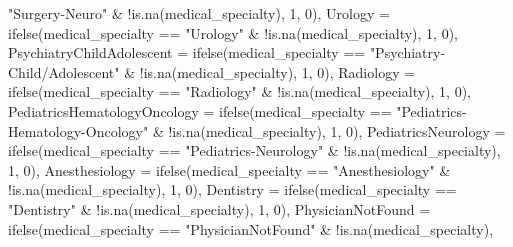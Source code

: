 \documentclass[
]{article}
\newenvironment{Shaded}{\begin{snugshade}}{\end{snugshade}}
\newcommand{\AttributeTok}[1]{\textcolor[rgb]{0.77,0.63,0.00}{#1}}
\newcommand{\DecValTok}[1]{\textcolor[rgb]{0.00,0.00,0.81}{#1}}
\newcommand{\FunctionTok}[1]{\textcolor[rgb]{0.00,0.00,0.00}{#1}}
\newcommand{\NormalTok}[1]{#1}
\newcommand{\SpecialCharTok}[1]{\textcolor[rgb]{0.00,0.00,0.00}{#1}}
\newcommand{\StringTok}[1]{\textcolor[rgb]{0.31,0.60,0.02}{#1}}
\begin{document}
\begin{Shaded}
\begin{Highlighting}[]
            \StringTok{"Surgery{-}Neuro"} \SpecialCharTok{\&} \SpecialCharTok{!}\FunctionTok{is.na}\NormalTok{(medical\_specialty),}
            \DecValTok{1}\NormalTok{, }\DecValTok{0}\NormalTok{), }\AttributeTok{Urology =} \FunctionTok{ifelse}\NormalTok{(medical\_specialty }\SpecialCharTok{==}
            \StringTok{"Urology"} \SpecialCharTok{\&} \SpecialCharTok{!}\FunctionTok{is.na}\NormalTok{(medical\_specialty),}
            \DecValTok{1}\NormalTok{, }\DecValTok{0}\NormalTok{), }\AttributeTok{PsychiatryChildAdolescent =} \FunctionTok{ifelse}\NormalTok{(medical\_specialty }\SpecialCharTok{==}
            \StringTok{"Psychiatry{-}Child/Adolescent"} \SpecialCharTok{\&} \SpecialCharTok{!}\FunctionTok{is.na}\NormalTok{(medical\_specialty),}
            \DecValTok{1}\NormalTok{, }\DecValTok{0}\NormalTok{), }\AttributeTok{Radiology =} \FunctionTok{ifelse}\NormalTok{(medical\_specialty }\SpecialCharTok{==}
            \StringTok{"Radiology"} \SpecialCharTok{\&} \SpecialCharTok{!}\FunctionTok{is.na}\NormalTok{(medical\_specialty),}
            \DecValTok{1}\NormalTok{, }\DecValTok{0}\NormalTok{), }\AttributeTok{PediatricsHematologyOncology =} \FunctionTok{ifelse}\NormalTok{(medical\_specialty }\SpecialCharTok{==}
            \StringTok{"Pediatrics{-}Hematology{-}Oncology"} \SpecialCharTok{\&} \SpecialCharTok{!}\FunctionTok{is.na}\NormalTok{(medical\_specialty),}
            \DecValTok{1}\NormalTok{, }\DecValTok{0}\NormalTok{), }\AttributeTok{PediatricsNeurology =} \FunctionTok{ifelse}\NormalTok{(medical\_specialty }\SpecialCharTok{==}
            \StringTok{"Pediatrics{-}Neurology"} \SpecialCharTok{\&} \SpecialCharTok{!}\FunctionTok{is.na}\NormalTok{(medical\_specialty),}
            \DecValTok{1}\NormalTok{, }\DecValTok{0}\NormalTok{), }\AttributeTok{Anesthesiology =} \FunctionTok{ifelse}\NormalTok{(medical\_specialty }\SpecialCharTok{==}
            \StringTok{"Anesthesiology"} \SpecialCharTok{\&} \SpecialCharTok{!}\FunctionTok{is.na}\NormalTok{(medical\_specialty),}
            \DecValTok{1}\NormalTok{, }\DecValTok{0}\NormalTok{), }\AttributeTok{Dentistry =} \FunctionTok{ifelse}\NormalTok{(medical\_specialty }\SpecialCharTok{==}
            \StringTok{"Dentistry"} \SpecialCharTok{\&} \SpecialCharTok{!}\FunctionTok{is.na}\NormalTok{(medical\_specialty),}
            \DecValTok{1}\NormalTok{, }\DecValTok{0}\NormalTok{), }\AttributeTok{PhysicianNotFound =} \FunctionTok{ifelse}\NormalTok{(medical\_specialty }\SpecialCharTok{==}
            \StringTok{"PhysicianNotFound"} \SpecialCharTok{\&} \SpecialCharTok{!}\FunctionTok{is.na}\NormalTok{(medical\_specialty),}

\end{Highlighting}
\end{Shaded}
\end{document}
